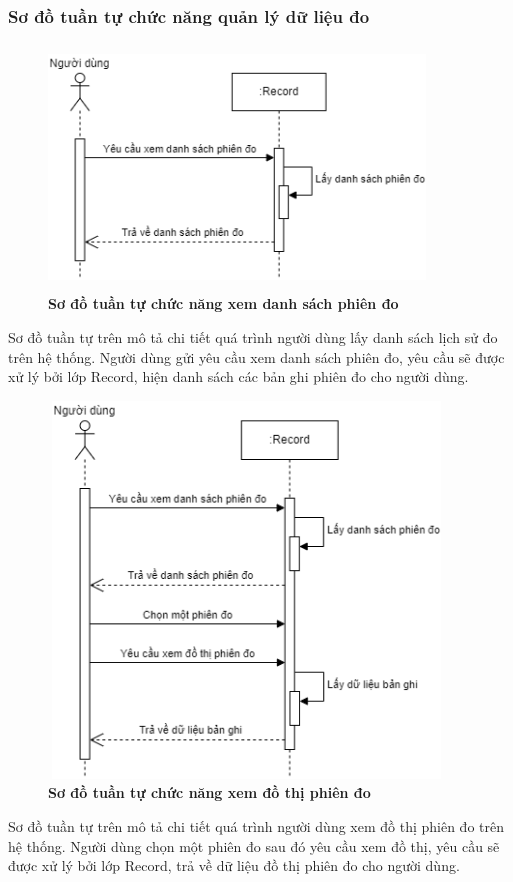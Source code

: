 \subsubsection{Sơ đồ tuần tự chức năng quản lý dữ liệu đo}
\begin{figure}[H]
  \centering
  \includegraphics[width=10cm,height=6.5cm]{Images/sequence/sequence_manage_record.png}
  \caption[Sơ đồ tuần tự chức năng xem danh sách phiên đo]{\bfseries \fontsize{12pt}{0pt}
  \selectfont Sơ đồ tuần tự chức năng xem danh sách phiên đo}
  \label{sequence_manage_record} %
\end{figure}
Sơ đồ tuần tự trên mô tả chi tiết quá trình người dùng lấy danh sách lịch sử đo trên hệ thống. Người dùng gửi yêu cầu xem danh sách phiên đo, 
yêu cầu sẽ được xử lý bởi lớp Record, hiện danh sách các bản ghi phiên đo cho người dùng.

\begin{figure}[H]
  \centering
  \includegraphics[width=10.5cm,height=10cm]{Images/sequence/sequence_manage_chart_record.png}
  \caption[Sơ đồ tuần tự chức năng xem đồ thị phiên đo]{\bfseries \fontsize{12pt}{0pt}
  \selectfont Sơ đồ tuần tự chức năng xem đồ thị phiên đo}
  \label{sequence_manage_chart_record} %
\end{figure}
Sơ đồ tuần tự trên mô tả chi tiết quá trình người dùng xem đồ thị phiên đo trên hệ thống. Người dùng chọn một phiên đo sau đó yêu cầu xem đồ thị, 
yêu cầu sẽ được xử lý bởi lớp Record, trả về dữ liệu đồ thị phiên đo cho người dùng.

